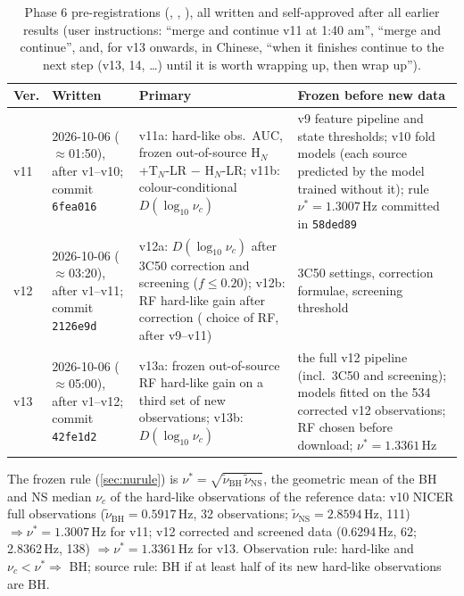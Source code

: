 \begin{table}[htbp]
\centering\footnotesize
\caption[Phase 6 pre-registrations]{Phase 6 pre-registrations (, , ),
all written and self-approved after all earlier results (user instructions: ``merge and continue v11 at 1:40 am'', ``merge and
continue'', and, for v13 onwards, in Chinese, ``when it finishes continue to the next step (v13, 14, \dots) until it is worth
wrapping up, then wrap up'').}
\label{tab:p6prereg}
\begin{tabularx}{\textwidth}{@{}p{0.8cm}p{3.2cm}>{\raggedright\arraybackslash}X>{\raggedright\arraybackslash}X@{}}
\toprule
Ver. & Written & Primary & Frozen before new data \\
\midrule
v11 & 2026-10-06 ($\approx$01:50), after v1--v10; commit \texttt{6fea016} & v11a: hard-like obs.\ AUC, frozen out-of-source H$_N$+T$_N$-LR $-$ H$_N$-LR; v11b: colour-conditional $D(\log_{10}\nu_c)$ & v9 feature pipeline and state thresholds; v10 fold models (each source predicted by the model trained without it); rule $\nu^*=1.3007$\,Hz committed in \texttt{58ded89} \\
v12 & 2026-10-06 ($\approx$03:20), after v1--v11; commit \texttt{2126e9d} & v12a: $D(\log_{10}\nu_c)$ after 3C50 correction and screening ($f\le0.20$); v12b: RF hard-like gain after correction (\PostHoc{} choice of RF, after v9--v11) & 3C50 settings, correction formulae, screening threshold \\
v13 & 2026-10-06 ($\approx$05:00), after v1--v12; commit \texttt{42fe1d2} & v13a: frozen out-of-source RF hard-like gain on a third set of new observations; v13b: $D(\log_{10}\nu_c)$ & the full v12 pipeline (incl.\ 3C50 and screening); models fitted on the 534 corrected v12 observations; RF chosen before download; $\nu^*=1.3361$\,Hz \\
\bottomrule
\end{tabularx}
\end{table}

The frozen rule (\cref{sec:nurule}) is $\nu^*=\sqrt{\tilde\nu_\mathrm{BH}\,\tilde\nu_\mathrm{NS}}$, the geometric mean of the BH and NS median
$\nu_c$ of the hard-like observations of the reference data: v10 NICER full observations ($\tilde\nu_\mathrm{BH}=0.5917$\,Hz, 32 observations;
$\tilde\nu_\mathrm{NS}=2.8594$\,Hz, 111) $\Rightarrow\nu^*=1.3007$\,Hz for v11; v12 corrected and screened data (0.6294\,Hz, 62; 2.8362\,Hz, 138)
$\Rightarrow\nu^*=1.3361$\,Hz for v13. Observation rule: hard-like and $\nu_c<\nu^*\Rightarrow$ BH; source rule: BH if at least half of its new
hard-like observations are BH.

